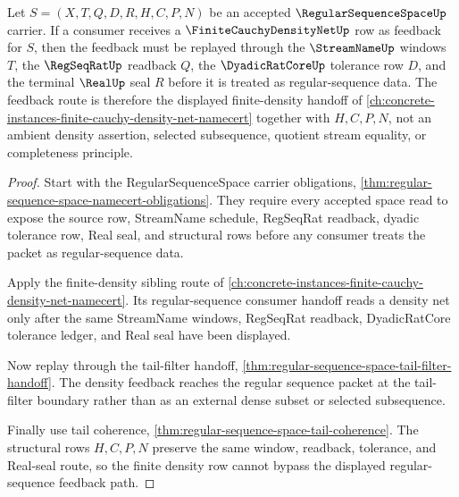 \begin{theorem}
\label{thm:regular-sequence-space-finite-density-feedback}
Let $S=(X,T,Q,D,R,H,C,P,N)$ be an accepted $\RegularSequenceSpaceUp$ carrier. If a consumer receives a $\FiniteCauchyDensityNetUp$ row as feedback for $S$, then the feedback must be replayed through the $\StreamNameUp$ windows $T$, the $\RegSeqRatUp$ readback $Q$, the $\DyadicRatCoreUp$ tolerance row $D$, and the terminal $\RealUp$ seal $R$ before it is treated as regular-sequence data. The feedback route is therefore the displayed finite-density handoff of \autoref{ch:concrete-instances-finite-cauchy-density-net-namecert} together with $H,C,P,N$, not an ambient density assertion, selected subsequence, quotient stream equality, or completeness principle.
\end{theorem}
\begin{proof}
Start with the RegularSequenceSpace carrier obligations, \autoref{thm:regular-sequence-space-namecert-obligations}. They require every accepted space read to expose the source row, StreamName schedule, RegSeqRat readback, dyadic tolerance row, Real seal, and structural rows before any consumer treats the packet as regular-sequence data.

Apply the finite-density sibling route of \autoref{ch:concrete-instances-finite-cauchy-density-net-namecert}. Its regular-sequence consumer handoff reads a density net only after the same StreamName windows, RegSeqRat readback, DyadicRatCore tolerance ledger, and Real seal have been displayed.

Now replay through the tail-filter handoff, \autoref{thm:regular-sequence-space-tail-filter-handoff}. The density feedback reaches the regular sequence packet at the tail-filter boundary rather than as an external dense subset or selected subsequence.

Finally use tail coherence, \autoref{thm:regular-sequence-space-tail-coherence}. The structural rows $H,C,P,N$ preserve the same window, readback, tolerance, and Real-seal route, so the finite density row cannot bypass the displayed regular-sequence feedback path.
\end{proof}

